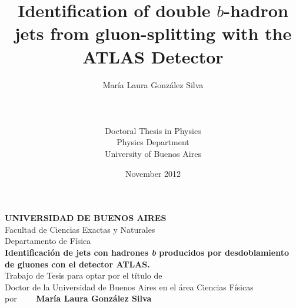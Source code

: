\documentclass[11pt,a4paper,12pt]{report}
\title{Identification of double $b$-hadron jets from gluon-splitting with the ATLAS Detector}
\author{Mar\'ia Laura Gonz\'alez Silva \\ \\ \\ \\Doctoral Thesis in Physics\\Physics Department\\University of Buenos Aires}
\date{November 2012}
\begin{document}
\maketitle


\newpage

\thispagestyle{empty}
\begin{figure}[h]
  \begin{center}
  \end{center}
\end{figure}

\begin{center}
  {\bfseries UNIVERSIDAD DE BUENOS AIRES}\\
  \vspace{0.5cm}
  Facultad de Ciencias Exactas y Naturales\\
  \vspace{0.5cm}
  Departamento de F\'isica\\
  \vspace{1.5cm}
         {\large {\bfseries Identificaci\'on de jets con hadrones \emph{b} producidos por desdoblamiento de gluones con el detector ATLAS.}}\\ %
         \vspace{1.5cm}
         Trabajo de Tesis para optar por el t\'itulo de \\
         Doctor de la Universidad de Buenos Aires en el \'area Ciencias F\'isicas\\
         \vspace{1.5cm}
         por $\qquad ${\bfseries Mar\'ia Laura Gonz\'alez Silva}\\
         \vspace{1.5cm}
\end{center}
\end{document}
